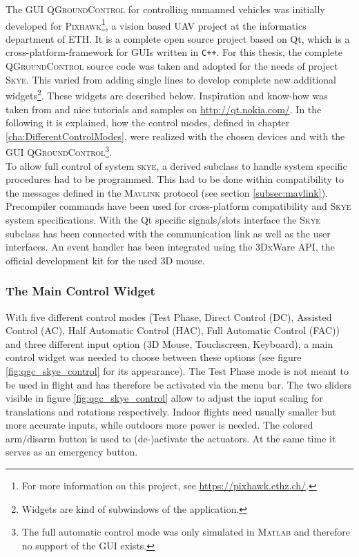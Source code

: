 The GUI \textsc{QGroundControl} for controlling unmanned vehicles was initially developed for \textsc{Pixhawk}\footnote{For more information on this project, see \url{https://pixhawk.ethz.ch/}.}, a vision based UAV project at the informatics department of \textsc{ETH}. It is a complete open source project based on Qt, which is a cross-platform-framework for GUIs written in \verb!C++!. For this thesis, the complete \textsc{QGroundControl} source code was taken and adopted for the needs of project \textsc{Skye}. This varied from adding single lines to develop complete new additional widgets\footnote{Widgets are kind of subwindows of the application.}. These widgets are described below. Inspiration and know-how was taken from \cite{blanchette} and nice tutorials and samples on \url{http://qt.nokia.com/}. In the following it is explained, how the control modes, defined in chapter \ref{cha:DifferentControlModes}, were realized with the chosen devices and with the GUI \textsc{QGroundControl}\footnote{The full automatic control mode was only simulated in \textsc{Matlab} and therefore no support of the GUI exists.}. 
\\
To allow full control of system \textsc{skye}, a derived subclass to handle system specific procedures had to be programmed. 
This had to be done within compatibility to the messages defined in the \textsc{Mavlink} protocol (see section \ref{subsec:mavlink}). Precompiler commands have been used for cross-platform compatibility and \textsc{Skye} system specifications. 
With the Qt specific signals/slots interface the \textsc{Skye} subclass has been connected with the communication link as well as the user interfaces. 
An event handler has been integrated using the 3DxWare API, the official development kit for the used 3D mouse.

\subsubsection{The Main Control Widget}
With five different control modes (Test Phase, Direct Control (DC), Assisted Control (AC), Half Automatic Control (HAC), Full Automatic Control (FAC)) and three different input option (3D Mouse, Touchscreen, Keyboard), a main control widget was needed to choose between these options (see figure \ref{fig:qgc_skye_control} for its appearance). 
The Test Phase mode is not meant to be used in flight and has therefore be activated via the menu bar.
The two sliders visible in figure \ref{fig:qgc_skye_control} allow to adjust the input scaling for translations and rotations respectively. Indoor flights need usually smaller but more accurate inputs, while outdoors more power is needed. The colored arm/disarm button is used to (de-)activate the actuators. At the same time it serves as an emergency button.

